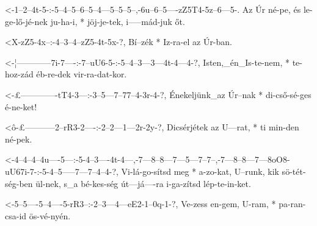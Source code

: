 
  {<-1--2--4t-5-:-5--4--5--6--5--4---5--5--5--,-6u--6--5----zZ5T4-5z--6---5-.}
  {  Az Úr né-pe, és le-ge-lő-jé-nek ju-ha-i, * jöj-je-tek, i-----mád-juk őt.}



  {<X-zZ5-4x--:-4--3--4--zZ5-4t-5x-?,}
  {   Bí--zék * Iz-ra-el az  Úr-ban.}


  {<-¦------------7i-7----:-7--uU6-5-:-5--4--3---3---4t-4---4-?,}
  {  Isten,_én_Is-te-nem, * te-hoz-zád éb-re-dek vir-ra-dat-kor.}

  {<-£-------------tT4-3---:-3--5---7--77--4-3r-4-?,}
  {  Énekeljünk_az Úr--nak * di-cső-sé-ges é-ne-ket!}

  {<ô-£-----------2--rR3-2----:-2--2---1---2r-2y-?,}
  {   Dicsérjétek az U---rat, * ti min-den né-pek.}

  {<-4--4--4--4u----5---:-5-4--3----4t-4---,-7---8--8---7---5---7--7--,-7---8--8---7---8oO8-uU67i-7-:-5-4--5-----7---7--4--4-?,}
  {  Vi-lá-go-sítsd meg * a-zo-kat, U--runk, kik sö-tét-ség-ben ül-nek, s_a bé-kes-ség út---já----ra  i-ga-zítsd lép-te-in-ket.}


  {<-5--5----5--4----5-rR3--:-2--3---4---eE2-1--0q-1-?,}
  {  Ve-zess en-gem, U-ram, * pa-ran-csa-id  ös-vé-nyén.}